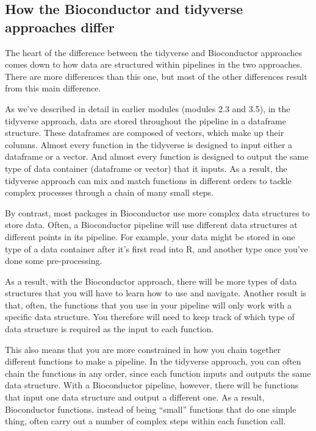 \documentclass[]{tufte-book}
\begin{document}
\subsection{How the Bioconductor and tidyverse approaches differ}\label{how-the-bioconductor-and-tidyverse-approaches-differ}

The heart of the difference between the tidyverse and Bioconductor approaches
comes down to how data are structured within pipelines in the two approaches.
There are more differences than this one, but most of the other differences
result from this main difference.

As we've described in detail in earlier modules (modules 2.3 and 3.5), in the
tidyverse approach, data are stored throughout the pipeline in a dataframe
structure. These dataframes are composed of vectors, which make up their
columns. Almost every function in the tidyverse is designed to input either a
dataframe or a vector. And almost every function is designed to output the same
type of data container (dataframe or vector) that it inputs. As a result, the
tidyverse approach can mix and match functions in different orders to tackle
complex processes through a chain of many small steps.

By contrast, most packages in Bioconductor use more complex data structures
to store data. Often, a Bioconductor pipeline will use different data
structures at different points in its pipeline. For example, your data might
be stored in one type of a data container after it's first read into R, and
another type once you've done some pre-processing.

As a result, with the Bioconductor approach, there will be more types of data
structures that you will have to learn how to use and navigate. Another
result is that, often, the functions that you use in your
pipeline will only work with a specific data structure. You therefore will need
to keep track of which type of data structure is required as the input to each
function.

This also means that you are more constrained in how you chain together
different functions to make a pipeline. In the tidyverse approach, you can often
chain the functions in any order, since each function inputs and outputs the
same data structure. With a Bioconductor pipeline, however, there
will be functions that input one data structure and output a different one.
As a result, Bioconductor functions, instead of being ``small''
functions that do one simple thing, often carry out a number of complex
steps within each function call.
\end{document}
